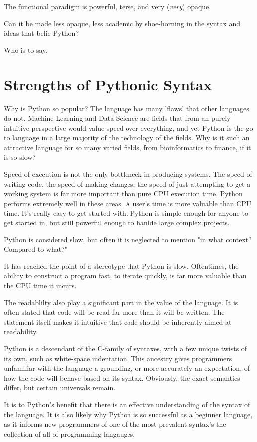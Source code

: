\documentclass{l4proj}
\begin{document}
The functional paradigm is powerful, terse, and very (\emph{very}) opaque.

Can it be made less opaque, less academic by shoe-horning in the syntax and ideas that belie Python?

Who is to say.

\section{Strengths of Pythonic Syntax}

Why is Python so popular? 
The language has many 'flaws' that other languages do not.
Machine Learning and Data Science are fields that from an purely intuitive perspective would value speed over everything, and yet Python is the go to language in a large majority of the technology of the fields.
Why is it such an attractive language for so many varied fields, from bioinformatics to finance, if it is so slow?

Speed of execution is not the only bottleneck in producing systems.
The speed of writing code, the speed of making changes, the speed of just attempting to get a working system is far more important than pure CPU execution time.
Python performs extremely well in these areas.
A user's time is more valuable than CPU time.
It's really easy to get started with.
Python is simple enough for anyone to get started in, but still powerful enough to hanlde large complex projects.

Python is considered slow, but often it is neglected to mention "in what context? Compared to what?"

It has reached the point of a stereotype that Python is slow.
Oftentimes, the ability to construct a program fast, to iterate quickly, is far more valuable than the CPU time it incurs.

The readablilty also play a significant part in the value of the language.
It is often stated that code will be read far more than it will be written.
The statement itself makes it intuitive that code should be inherently aimed at readability.

Python is a descendant of the C-family of syntaxes, with a few unique twists of its own, such as white-space indentation.
This ancestry gives programmers unfamiliar with the language a grounding, or more accurately an expectation, of how the code will behave based on its syntax.
Obviously, the exact semantics differ, but certain universals remain.

It is to Python's benefit that there is an effective understanding of the syntax of the language.
It is also likely why Python is so successful as a beginner language, as it informs new programmers of one of the most prevalent syntax's the collection of all of programming langauges.
\end{document}
